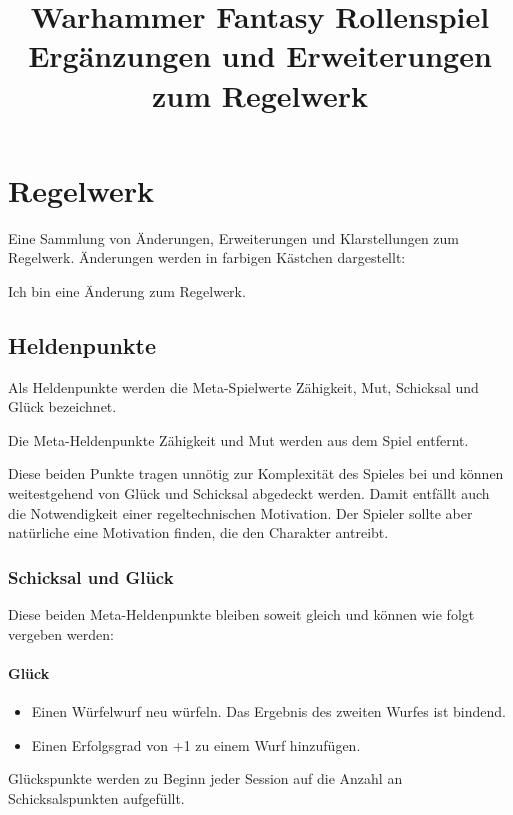 \documentclass[a4paper,10pt,twoside,twocolumn,openany,bg=none]{dndbook}
\title{
  Warhammer Fantasy Rollenspiel\newline
  \large Ergänzungen und Erweiterungen zum Regelwerk
  }
\date{}
\begin{document}
\frontmatter





\chapter{Regelwerk}
\noindent
Eine Sammlung von Änderungen, Erweiterungen und Klarstellungen zum Regelwerk.
Änderungen werden in farbigen Kästchen dargestellt:
\begin{DndReadAloud}
  Ich bin eine Änderung zum Regelwerk.
\end{DndReadAloud}


\section{Heldenpunkte}
Als Heldenpunkte werden die Meta-Spielwerte Zähigkeit, Mut, Schicksal und Glück bezeichnet.


\begin{DndReadAloud}
  Die Meta-Heldenpunkte Zähigkeit und Mut werden aus dem Spiel entfernt.
\end{DndReadAloud}
\noindent
Diese beiden Punkte tragen unnötig zur Komplexität des Spieles bei und können weitestgehend von Glück und Schicksal abgedeckt werden.
Damit entfällt auch die Notwendigkeit einer regeltechnischen Motivation.
Der Spieler sollte aber natürliche eine Motivation finden, die den Charakter antreibt.



\subsection{Schicksal und Glück}
Diese beiden Meta-Heldenpunkte bleiben soweit gleich und können wie folgt vergeben werden:
\subsubsection{Glück}
\begin{itemize}
  \item Einen Würfelwurf neu würfeln. Das Ergebnis des zweiten Wurfes ist bindend.
  \item Einen Erfolgsgrad von +1 zu einem Wurf hinzufügen.
\end{itemize}
Glückspunkte werden zu Beginn jeder Session auf die Anzahl an Schicksalspunkten aufgefüllt.
\end{document}
